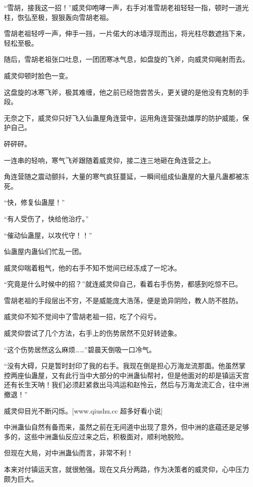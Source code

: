 
\begin{this_body}

“雪胡，接我这一招！”威灵仰咆哮一声，右手对准雪胡老祖轻轻一指，顿时一道光柱，恢弘至极，狠狠轰向雪胡老祖。

雪胡老祖轻哼一声，伸手一挡，一片偌大的冰墙浮现而出，将光柱尽数遮挡下来，轻松至极。

随后，雪胡老祖张口吐息，一团团寒冰气息，如盘旋的飞斧，向威灵仰飚射而去。

威灵仰顿时脸色一变。

这盘旋的冰寒飞斧，极其难缠，他之前已经饱尝苦头，更关键的是他没有克制的手段。

无奈之下，威灵仰只好飞入仙蛊屋角连营中，运用角连营强劲雄厚的防护威能，保护自己。

砰砰砰。

一连串的轻响，寒气飞斧跟随着威灵仰，接二连三地砸在角连营之上。

角连营随之震动颤抖，大量的寒气疯狂蔓延，一瞬间组成仙蛊屋的大量凡蛊都被冻死。

“快，修复仙蛊屋！”

“有人受伤了，快给他治疗。”

“催动仙蛊屋，以攻代守！！”

仙蛊屋内蛊仙们忙乱一团。

威灵仰喘着粗气，他的右手不知不觉间已经冻成了一坨冰。

“究竟是什么时候中的招？”就连威灵仰自己，看着右手伤势，都感到吃惊不已。

雪胡老祖的手段层出不穷，不是威能庞大浩荡，便是诡异阴险，教人防不胜防。

威灵仰不知不觉间中了雪胡老祖一招，吃了个闷亏。

威灵仰尝试了几个方法，右手上的伤势居然不见好转迹象。

“这个伤势居然这么麻烦……”碧晨天倒吸一口冷气。

“没有大碍，只是暂时封印了我的右手。我现在倒是担心万海龙流那面。他虽然掌控两座仙蛊屋，又有此行当中大部分的中洲蛊仙帮衬，但是他面对的却是镇运天宫还有长生天呐！我们必须赶紧救出马鸿运和赵怜云，然后与万海龙流汇合，往中洲撤退！”

威灵仰目光不断闪烁。[www.qiushu.cc 超多好看小说]

中洲蛊仙自然有备而来，虽然之前在无间道中出现了意外，但中洲的底蕴还是足够多的，这些中洲蛊仙反应过来之后，积极面对，顺利地脱险。

但现在大局，对中洲蛊仙而言，非常不利！

本来对付镇运天宫，就很勉强。现在又兵分两路，作为决策者的威灵仰，心中压力颇为巨大。


\end{this_body}
